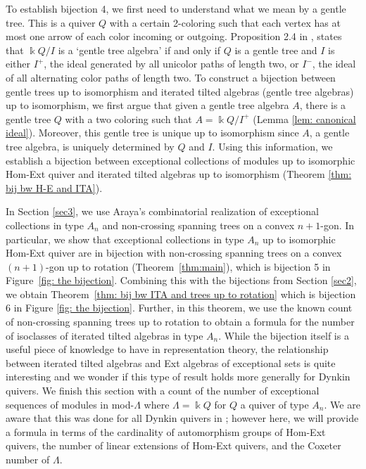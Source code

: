 \documentclass[12pt]{amsart}
\theoremstyle{definition}
\theoremstyle{remark}
\numberwithin{equation}{section}
\begin{document}
To establish bijection 4, we first need to understand what we mean by a gentle tree. This is a quiver $Q$ with a certain 2-coloring such that each vertex has at most one arrow of each color incoming or outgoing. Proposition 2.4 in \cite{qiu2013ext}, states that $\Bbbk Q/I$ is a `gentle tree algebra' if and only if $Q$ is a gentle tree and $I$ is either $I^+$, the ideal generated by all unicolor paths of length two, or $I^-$, the ideal of all alternating color paths of length two. To construct a bijection between gentle trees up to isomorphism and iterated tilted algebras (gentle tree algebras) up to isomorphism, we first argue that given a gentle tree algebra $A$, there is a gentle tree $Q$ with a two coloring such that $A = \Bbbk Q/I^+$ (Lemma \ref{lem: canonical ideal}). Moreover, this gentle tree is unique up to isomorphism since $A$, a gentle tree algebra, is uniquely determined by $Q$ and $I$. Using this information, we establish a bijection between exceptional collections of modules up to isomorphic Hom-Ext quiver and iterated tilted algebras up to isomorphism (Theorem \ref{thm: bij bw H-E and ITA}).

In Section \ref{sec3}, we use Araya's combinatorial realization of exceptional collections in type $A_n$ and non-crossing spanning trees on a convex $n+1$-gon. In particular, we show that exceptional collections in type $A_n$ up to isomorphic Hom-Ext quiver are in bijection with non-crossing spanning trees on a convex $(n+1)$-gon up to rotation (Theorem~\ref{thm:main}), which is bijection 5 in Figure~\ref{fig: the bijection}. Combining this with the bijections from Section \ref{sec2}, we obtain Theorem~\ref{thm: bij bw ITA and trees up to rotation} which is bijection 6 in Figure \ref{fig: the bijection}. Further, in this theorem, we use the known count of non-crossing spanning trees up to rotation to obtain a formula for the number of isoclasses of iterated tilted algebras in type $A_n$. While the bijection itself is a useful piece of knowledge to have in representation theory, the relationship between iterated tilted algebras and Ext algebras of exceptional sets is quite interesting and we wonder if this type of result holds more generally for Dynkin quivers. We finish this section with a count of the number of exceptional sequences of modules in mod-$\Lambda$ where $\Lambda = \Bbbk Q$ for $Q$ a quiver of type $A_n$. We are aware that this was done for all Dynkin quivers in \cite{obaid2013number}; however here, we will provide a formula in terms of the cardinality of automorphism groups of Hom-Ext quivers, the number of linear extensions of Hom-Ext quivers, and the Coxeter number of $\Lambda$.
\end{document}
